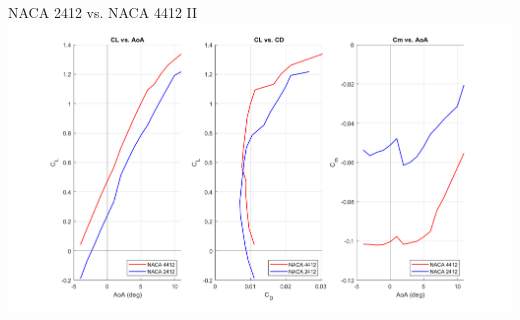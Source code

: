 \documentclass{beamer}
\begin{document}
    \begin{frame}{NACA 2412 vs. NACA 4412 II}
        \centering
        \includegraphics[width=\textwidth]{figures/newfoilplots.png}
    \end{frame}
\end{document}

